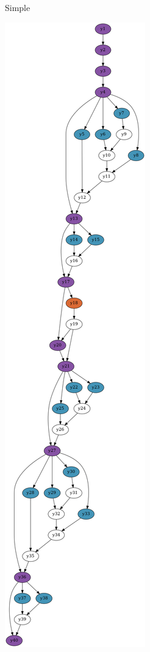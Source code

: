 \documentclass[../diploma.tex]{subfiles}
\begin{document}
\begin{figure}[htbp]
\begin{adjustwidth}{-2cm}{-2cm}
\begin{subfigure}{0.28\textwidth}
    \caption{Simple}
    \end{subfigure}
    \begin{subfigure}{0.28\textwidth}
      \centering
    \includegraphics[width=\textwidth]{graph_recursion2.png}

\end{subfigure}
\end{adjustwidth}
\end{figure}
\end{document}
